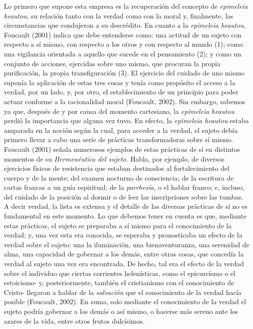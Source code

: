\begin{refsection}
Lo primero que supone esta empresa es la recuperación del concepto de \emph{epimeleia heautou,} su relación tanto con la verdad como con la moral y, finalmente, las circunstancias que condujeron a su descrédito. En cuanto a la \emph{epimeleia heautou,} Foucault (2001) indica que debe entenderse como: una actitud de un sujeto con respecto a sí mismo, con respecto a los otros y con respecto al mundo (1); como una vigilancia orientada a aquello que sucede en el pensamiento (2); y como un conjunto de acciones, ejercidas sobre uno mismo, que procuran la propia purificación, la propia transfiguración (3). El ejercicio del cuidado de uno mismo suponía la aplicación de estas tres cosas y tenía como propósito el acceso a la verdad, por un lado, y, por otro, el establecimiento de un principio para poder actuar conforme a la racionalidad moral (Foucault, 2002). Sin embargo, sabemos ya que, después de y por causa del momento cartesiano, la \emph{epimeleia heautou} perdió la importancia que alguna vez tuvo. En efecto, la \emph{epimeleia heautou} estaba amparada en la noción según la cual, para acceder a la verdad, el sujeto debía primero llevar a cabo una serie de prácticas transformadoras sobre sí mismo. Foucault (2001) señala numerosos ejemplos de estas prácticas de sí en distintos momentos de su \emph{Hermenéutica del sujeto.} Habla, por ejemplo, de diversos ejercicios físicos de resistencia que estaban destinados al fortalecimiento del cuerpo y de la mente; del examen nocturno de consciencia; de la escritura de cartas francas a un guía espiritual; de la \emph{parrhesía,} o el hablar franco; e, incluso, del cuidado de la posición al dormir o de leer las inscripciones sobre las tumbas. A decir verdad, la lista es extensa y el detalle de las diversas prácticas de sí no es fundamental en este momento. Lo que debemos tener en cuenta es que, mediante estas prácticas, el sujeto se preparaba a sí mismo para el conocimiento de la verdad; y, una vez esta era conocida, se esperaba y pronosticaba un efecto de la verdad sobre el sujeto: una la iluminación, una bienaventuranza, una serenidad de alma, una capacidad de gobernar a los demás, entre otras cosas, que concedía la verdad al sujeto una vez era encontrada. De hecho, tal era el efecto de la verdad sobre el individuo que ciertas corrientes helenísticas, como el epicureísmo o el estoicismo- y, posteriormente, también el cristianismo con el conocimiento de Cristo- llegaron a hablar de la \emph{salvación} que el conocimiento de la verdad hacía posible (Foucault, 2002). En suma, solo mediante el conocimiento de la verdad el sujeto podría gobernar a los demás o así mismo, o hacerse más sereno ante los azares de la vida, entre otros frutos dulcísimos.


\end{refsection}
